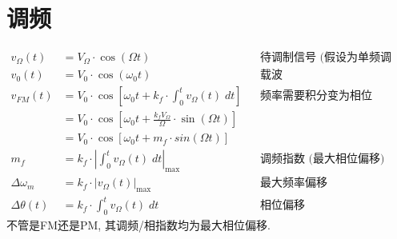\documentclass[a4paper]{report}
\begin{document}
\section{调频}
\begin{align*}
  v_{\Omega}(t)&=V_\Omega\cdot \cos(\Omega t)&&\text{待调制信号 (假设为单频调制)}\\
  v_0(t)&=V_0\cdot\cos(\omega_0 t) &&\text{载波}\\
  v_{FM}(t)&=V_0\cdot \cos[\omega_0 t+k_f\cdot \int_0^t v_\Omega (t) \; dt]  &&\text{频率需要积分变为相位}\\ 
  &=V_0\cdot \cos[\omega_0 t+\frac{k_f V_\Omega}{\Omega}\cdot \sin(\Omega t)]\\
  &=V_0\cdot\cos[\omega_0 t+m_f\cdot sin(\Omega t)]\\
  m_f&=k_f\cdot |\int_0^t v_\Omega (t) \; dt|_{\text{max}}&&\text{调频指数 (最大相位偏移)}\\
  \Delta \omega_m&=k_f\cdot |v_\Omega(t)|_{\text{max}} &&\text{最大频率偏移}\\
  \Delta \theta(t)&=k_f\cdot \int_0^t v_\Omega (t) \; dt &&\text{相位偏移}
\end{align*}
不管是FM还是PM, 其调频/相指数均为最大相位偏移. 
\end{document}

